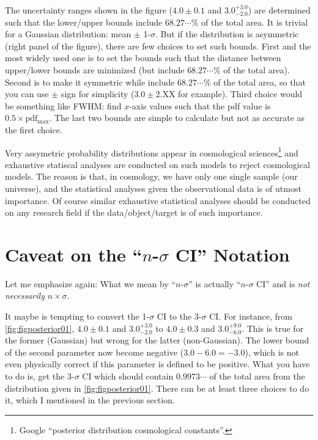The uncertainty ranges shown in the figure ($ 4.0 \pm 0.1 $ and $ 3.0^{+3.0}_{-2.0} $) are determined such that the lower/upper bounds include $ 68.27 \cdots \% $ of the total area. It is trivial for a Gaussian distribution: mean $ \pm $ 1-$ \sigma $. But if the distribution is asymmetric (right panel of the figure), there are few choices to set such bounds. First and the most widely used one is to set the bounds such that the distance between upper/lower bounds are minimized (but include $ 68.27 \cdots \% $ of the total area). Second is to make it symmetric while include $ 68.27 \cdots \% $ of the total area, so that you can use $ \pm $ sign for simplicity ($ 3.0 \pm 2.\mathrm{XX} $ for example). Third choice would be something like FWHM: find $ x $-axis values such that the pdf value is $ 0.5 \times \mathrm{pdf_{max}} $. The last two bounds are simple to calculate but not as accurate as the first choice.

Very assymetric probability distributions appear in cosmological sciences\footnote{Google ``posterior distribution cosmological constants''.} and exhaustive statiscal analyses are conducted on such models to reject cosmological models. The reason is that, in cosmology, we have only one single sample (our universe), and the statistical analyses given the observational data is of utmost importance. Of course similar exhaustive statistical analyses should be conducted on any research field if the data/object/target is of such importance. 



\section{Caveat on the ``$ n $-$ \sigma $ CI'' Notation}
Let me emphasize again: What we mean by ``$ n $-$ \sigma $'' is actually ``$ n $-$ \sigma $ CI'' and is \textit{not necessarily} $ n \times \sigma $. 

It maybe is tempting to convert the 1-$ \sigma $ CI to the 3-$ \sigma $ CI. For instance, from \cref{fig:figposterior01}, $ 4.0 \pm 0.1 $ and $ 3.0^{+3.0}_{-2.0} $ to $ 4.0 \pm 0.3 $ and $ 3.0^{+9.0}_{-6.0} $. This is true for the former (Gaussian) but wrong for the latter (non-Gaussian). The lower bound of the second parameter now become negative ($ 3.0 - 6.0 = -3.0 $), which is not even physically correct if this parameter is defined to be positive. What you have to do is, get the 3-$ \sigma $ CI which should contain $ 0.9973\cdots $ of the total area from the distribution given in \cref{fig:figposterior01}. There can be at least three choices to do it, which I mentioned in the previous section.


